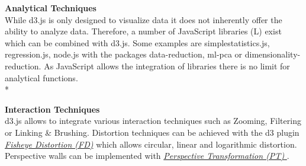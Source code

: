 \textbf{Analytical Techniques}\\
While d3.js is only designed to visualize data it does not inherently offer the ability to analyze data. Therefore, a number of JavaScript libraries (L) exist which can be combined with d3.js. Some examples are simplestatistics.js, regression.js, node.js with the packages data-reduction, ml-pca or dimensionality-reduction. 
As JavaScript allows the integration of libraries there is no limit for analytical functions. \\*

\textbf{Interaction Techniques}\\
d3.js allows to integrate various interaction techniques such as Zooming, Filtering or Linking \& Brushing. Distortion techniques can be achieved with the d3 plugin \hyperlink{https://bost.ocks.org/mike/fisheye/}{\textit{Fisheye Distortion (FD)}}\cite{Bostock2012} which allows circular, linear and logarithmic distortion.
Perspective walls can be implemented with \hyperlink{https://bl.ocks.org/mbostock/10571478}{\textit{Perspective Transformation (PT) }}\cite{Bostock2017}.\\


